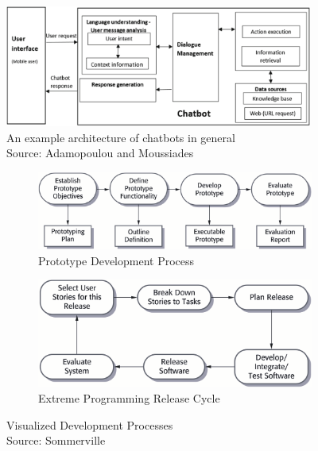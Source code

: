 \begin{figure}[t]
\centering
\captionsetup{justification=centering}
\includegraphics[width=0.9\textwidth]{graphics/chatbot-architecture-general.png}
\caption{An example architecture of chatbots in general \\Source: Adamopoulou and Moussiades \cite{adamopoulou_overview_2020}}
\label{fig:chatbot-architecture-general}
\end{figure}

\begin{figure}[h]
\centering
  \begin{subfigure}{.7\textwidth}
    \includegraphics[width=\textwidth]{graphics/prototype-dev.png}
    \caption{Prototype Development Process}
    \label{fig:prototype-process}
  \end{subfigure} \hfill
  \begin{subfigure}{.63\textwidth}
    \includegraphics[width=\textwidth]{graphics/extreme-programming-release-cycle.png}
    \caption{Extreme Programming Release Cycle}
    \label{fig:extreme-prog-cycle}
    \end{subfigure}
  \caption{Visualized Development Processes \\ Source: Sommerville \cite{sommerville_software_2011}}
  \label{fig:dev-processes}
\end{figure}

